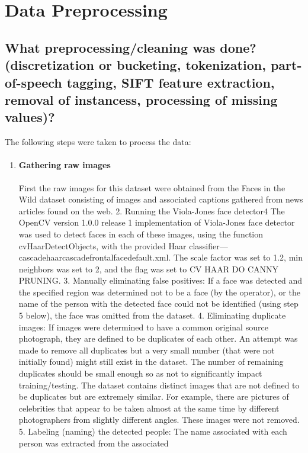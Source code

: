 \section*{Data Preprocessing}
\subsection*{What preprocessing/cleaning was done? (\eg discretization or bucketing, tokenization, part-of-speech tagging, SIFT feature extraction, removal of instancess, processing of missing values)?}
\noindent The following steps were taken to process the data:
\begin{enumerate}

\item \paragraph{Gathering raw images} First the raw images for this
dataset were obtained from the Faces in the Wild dataset
consisting of images and associated captions gathered from
news articles found on the web.
2. Running the Viola-Jones face detector4 The OpenCV version 1.0.0 release 1 implementation of Viola-Jones face detector was used to detect faces in each of these images, using
the function cvHaarDetectObjects, with the provided Haar
classifier—cascadehaarcascadefrontalfacedefault.xml. The
scale factor was set to 1.2, min neighbors was set to 2, and
the flag was set to CV HAAR DO CANNY PRUNING.
3. Manually eliminating false positives: If a face was detected and the specified region was determined not to be a
face (by the operator), or the name of the person with the
detected face could not be identified (using step 5 below),
the face was omitted from the dataset.
4. Eliminating duplicate images: If images were determined
to have a common original source photograph, they are defined to be duplicates of each other. An attempt was made to
remove all duplicates but a very small number (that were not
initially found) might still exist in the dataset. The number
of remaining duplicates should be small enough so as not
to significantly impact training/testing. The dataset contains
distinct images that are not defined to be duplicates but are
extremely similar. For example, there are pictures of celebrities that appear to be taken almost at the same time by different photographers from slightly different angles. These
images were not removed.
5. Labeling (naming) the detected people: The name associated with each person was extracted from the associated
\end{enumerate}

